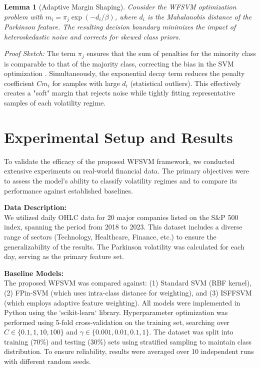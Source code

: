 \documentclass[twoside]{article}
\newtheorem{lemma}{Lemma}
\begin{document}
	\begin{lemma}
		[Adaptive Margin Shaping] 
		Consider the WFSVM optimization problem with $m_i = \pi_j \exp(-d_i/\beta)$, where $d_i$ is the Mahalanobis distance of the Parkinson feature. The resulting decision boundary minimizes the impact of heteroskedastic noise and corrects for skewed class priors.
	\end{lemma}
	
	\textit{Proof Sketch:} The term $\pi_j$ ensures that the sum of penalties for the minority class is comparable to that of the majority class, correcting the bias in the SVM optimization \cite{Wu2009a}. Simultaneously, the exponential decay term reduces the penalty coefficient $C m_i$ for samples with large $d_i$ (statistical outliers). This effectively creates a "soft" margin that rejects noise while tightly fitting representative samples of each volatility regime.
	
	\section{Experimental Setup and Results}
	To validate the efficacy of the proposed WFSVM framework, we conducted extensive experiments on real-world financial data. The primary objectives were to assess the model's ability to classify volatility regimes and to compare its performance against established baselines.
	
	\noindent\textbf{Data Description:} \\
	We utilized daily OHLC data for 20 major companies listed on the S\&P 500 index, spanning the period from 2018 to 2023. This dataset includes a diverse range of sectors (Technology, Healthcare, Finance, etc.) to ensure the generalizability of the results. The Parkinson volatility was calculated for each day, serving as the primary feature set.
	
	\noindent\textbf{Baseline Models:} \\
	The proposed WFSVM was compared against: (1) Standard SVM (RBF kernel), (2) FPin-SVM (which uses intra-class distance for weighting), and (3) ISFFSVM (which employs adaptive feature weighting). All models were implemented in Python using the `scikit-learn` library. 
	Hyperparameter optimization was performed using 5-fold cross-validation on the training set, searching over $C \in \{0.1, 1, 10, 100\}$ and $\gamma \in \{0.001, 0.01, 0.1, 1\}$. The dataset was split into training (70\%) and testing (30\%) sets using stratified sampling to maintain class distribution. To ensure reliability, results were averaged over 10 independent runs with different random seeds.
	
\end{document}
